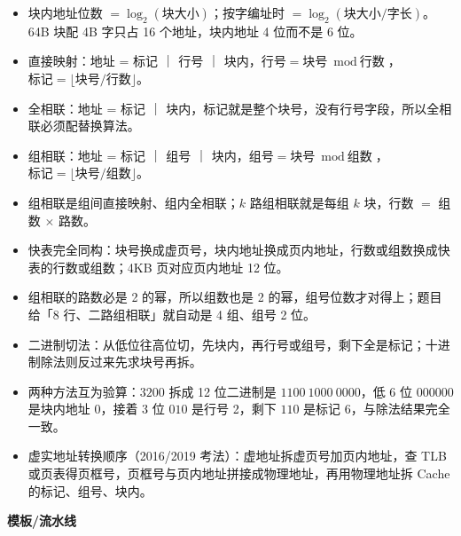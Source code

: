 \documentclass[10pt,a4paper]{ctexart}
\begin{document}
\begin{itemize}

\item 块内地址位数 $=\log_2(\text{块大小})$；按字编址时 $=\log_2(\text{块大小}/\text{字长})$。64B 块配 4B 字只占 16 个地址，块内地址 4 位而不是 6 位。

\item 直接映射：地址 = 标记 ｜ 行号 ｜ 块内，$\text{行号}=\text{块号}\bmod\text{行数}$，$\text{标记}=\lfloor\text{块号}/\text{行数}\rfloor$。

\item 全相联：地址 = 标记 ｜ 块内，标记就是整个块号，没有行号字段，所以全相联必须配替换算法。

\item 组相联：地址 = 标记 ｜ 组号 ｜ 块内，$\text{组号}=\text{块号}\bmod\text{组数}$，$\text{标记}=\lfloor\text{块号}/\text{组数}\rfloor$。

\item 组相联是组间直接映射、组内全相联；$k$ 路组相联就是每组 $k$ 块，行数 $=$ 组数 $\times$ 路数。

\item 快表完全同构：块号换成虚页号，块内地址换成页内地址，行数或组数换成快表的行数或组数；4KB 页对应页内地址 12 位。

\item 组相联的路数必是 2 的幂，所以组数也是 2 的幂，组号位数才对得上；题目给「8 行、二路组相联」就自动是 4 组、组号 2 位。

\item 二进制切法：从低位往高位切，先块内，再行号或组号，剩下全是标记；十进制除法则反过来先求块号再拆。

\item 两种方法互为验算：$3200$ 拆成 12 位二进制是 $1100\ 1000\ 0000$，低 6 位 $000000$ 是块内地址 0，接着 3 位 $010$ 是行号 2，剩下 $110$ 是标记 6，与除法结果完全一致。

\item 虚实地址转换顺序（2016/2019 考法）：虚地址拆虚页号加页内地址，查 TLB 或页表得页框号，页框号与页内地址拼接成物理地址，再用物理地址拆 Cache 的标记、组号、块内。

\end{itemize}

\textbf{模板/流水线}

\end{document}
